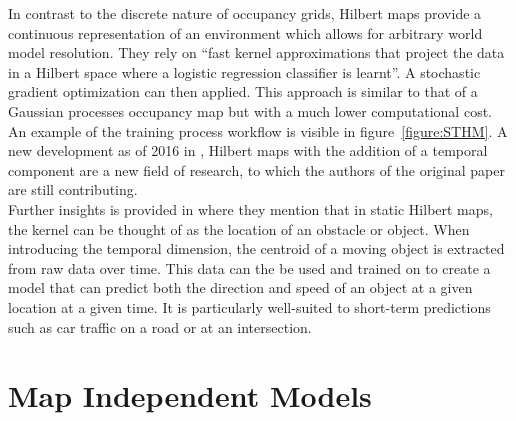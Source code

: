   In contrast to the discrete nature of occupancy grids, Hilbert maps provide a
  continuous representation of an environment which allows for arbitrary world
  model resolution. They rely on ``fast kernel approximations that project the data in a Hilbert space where a logistic regression classifier is learnt''.
  A stochastic gradient optimization can then applied. This approach is similar to
  that of a Gaussian processes occupancy map but with a much lower computational
  cost. An example
  of the training process workflow is visible in figure~\ref{figure:STHM}.
  A new development as of 2016 in \cite{Ramos2016, Senanayake2016}, Hilbert maps with the addition of a temporal
  component are a new field of research, to which the authors of
  the original paper are still contributing. \\

  Further insights is provided in \cite{Senanayake2016} \cite{Senanayake2017}
  where they mention that
  in static Hilbert maps, the kernel can be thought of as the location of an
  obstacle or object. When introducing the temporal dimension, the centroid of a
  moving object is extracted from raw data over time. This data can the be used
  and trained on to create a model that can predict both the direction and speed of an
  object at a given location at a given time. It is particularly well-suited to
  short-term predictions such as car traffic on a road or at an intersection.
   \\

  \section{ Map Independent Models }

